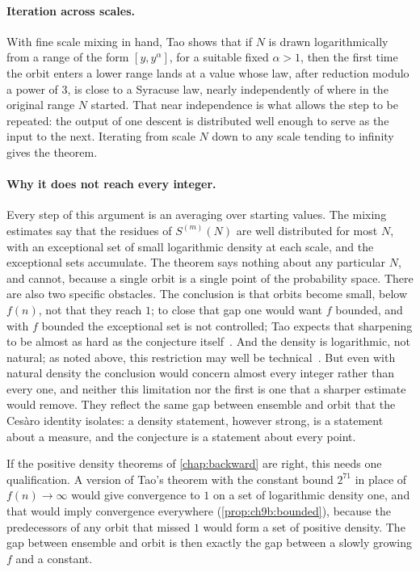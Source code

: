 \paragraph{Iteration across scales.} With fine scale mixing in hand, Tao shows
that if $N$ is drawn logarithmically from a range of the form $[y,y^{\alpha}]$,
for a suitable fixed $\alpha>1$, then the first time the orbit enters a lower
range lands at a value whose law, after reduction modulo a power of $3$, is
close to a Syracuse law, nearly independently of where in the original range
$N$ started. That near independence is what allows the step to be repeated:
the output of one descent is distributed well enough to serve as the input to
the next. Iterating from scale $N$ down to any scale tending to infinity gives
the theorem.

\paragraph{Why it does not reach every integer.} Every step of this argument
is an averaging over starting values. The mixing estimates say that the
residues of $S^{(m)}(N)$ are well distributed for most $N$, with an exceptional
set of small logarithmic density at each scale, and the exceptional sets
accumulate. The theorem says nothing about any particular $N$, and cannot,
because a single orbit is a single point of the probability space. There are
also two specific obstacles. The conclusion is that orbits become small, below
$f(n)$, not that they reach $1$; to close that gap one would want $f$ bounded,
and with $f$ bounded the exceptional set is not controlled; Tao expects that sharpening to be almost as hard as the conjecture itself~\cite[Remark~1.4]{tao2022}.
And the density is logarithmic, not natural; as noted above, this restriction may well be technical~\cite[Remark~1.16]{tao2022}.
But even with natural density the conclusion would concern almost every integer rather than every one, and neither this limitation nor the first is one that a sharper estimate would remove.
They reflect the same gap between ensemble and orbit
that the Ces\`aro identity isolates: a density statement, however strong, is a
statement about a measure, and the conjecture is a statement about every point.

If the positive density theorems of \cref{chap:backward} are right, this needs one qualification. A version of Tao's theorem with the constant bound $2^{71}$ in place of $f(n)\to\infty$ would give convergence to $1$ on a set of logarithmic density one, and that would imply convergence everywhere (\cref{prop:ch9b:bounded}), because the predecessors of any orbit that missed $1$ would form a set of positive density. The gap between ensemble and orbit is then exactly the gap between a slowly growing $f$ and a constant.


